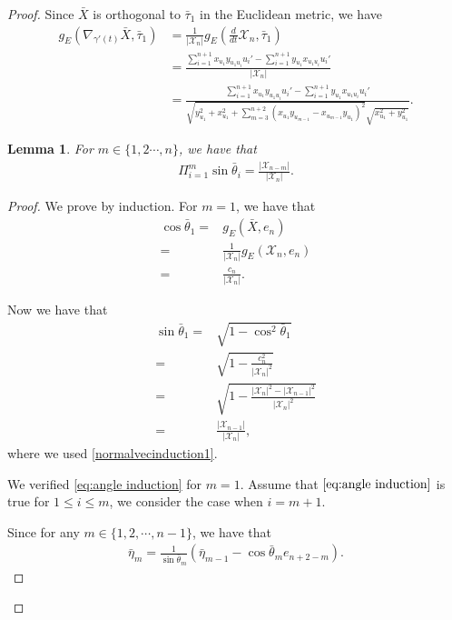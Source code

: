 \documentclass[11pt,letterpaper]{amsart}
\newtheorem{lem}{Lemma}[section]
\begin{document}
\begin{proof}
    Since $\bar{X}$ is orthogonal to $\bar{\tau}_1$ in the Euclidean metric, we have
    \begin{align*}
        g_E(\nabla_{\gamma'(t)}\bar{X},\bar{\tau}_1)&=\frac{1}{|\mathcal{X}_n|}g_E(\frac{d}{dt}\mathcal{X}_n,\bar{\tau}_1)\\
        &=\frac{\sum_{i=1}^{n+1}x_{u_1}y_{u_1u_i}u_i'-\sum_{i=1}^{n+1}y_{u_1}x_{u_1u_{i}}u_i'}{|\mathcal{X}_n|}\\
        &=\frac{\sum_{i=1}^{n+1}x_{u_1}y_{u_1u_i}u_i'-\sum_{i=1}^{n+1}y_{u_1}x_{u_1u_{i}}u_i'}{\sqrt{y_{u_1}^2+x_{u_1}^2+\sum_{m=3}^{n+2}(x_{u_1}y_{u_{m-1}}-x_{u_{m-1}}y_{u_1})^2}\sqrt{x^2_{u_1}+y^2_{u_1}}}.
    \end{align*}

\begin{lem}
    For $m\in\{1,2\cdots, n\}$, we have that
    \begin{align}\label{eq:angle induction}
        \Pi_{i=1}^m\sin\bar{\theta}_i=\frac{|\mathcal{X}_{n-m}|}{|\mathcal{X}_{n}|}.
    \end{align}
\end{lem}
\begin{proof}

We prove by induction. For $m=1$, we have that
\begin{align*}
    \cos\bar{\theta}_1=&g_E(\bar{X},e_n)\\
                      =&\frac{1}{|\mathcal{X}_n|}g_E(\mathcal{X}_n,e_n)\\
                      =&\frac{c_n}{|\mathcal{X}_n|}.
\end{align*}

Now we have that
\begin{align*}
    \sin\bar{\theta}_1=&\sqrt{1-\cos^2\bar{\theta}_1}\\
                      =&\sqrt{1-\frac{c_n^2}{|\mathcal{X}_n|^2}}\\
                      =&\sqrt{1-\frac{|\mathcal{X}_n|^2-|\mathcal{X}_{n-1}|^2}{|\mathcal{X}_n|^2}}\\
                      =&\frac{|\mathcal{X}_{n-1}|}{|\mathcal{X}_n|},
\end{align*}
where we used \eqref{normalvecinduction1}.

We verified \eqref{eq:angle induction} for $m=1$. Assume that $\eqref{eq:angle induction}$ is true for $1\leq i\leq m$, we consider the case when $i=m+1$.

Since for any $m\in\{1,2,\cdots, n-1\}$, we have that
\begin{align*}
    \bar{\eta}_{m}=\frac{1}{\sin\bar{\theta}_m}\left(\bar{\eta}_{m-1}-\cos\bar{\theta}_{m}e_{n+2-m}\right).
\end{align*}


\end{proof}
\end{proof}
\end{document}
